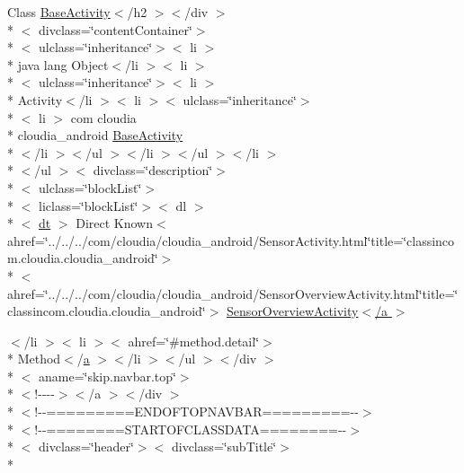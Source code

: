 \begin{DoxyCompactItemize}
 Class \hyperlink{index-2_8html_a61e95a6a9edfa0964ff3438abd1581e4}{Base\-Activity}$<$/h2 $>$$<$/div $>$\\*
$<$ divclass=\char`\"{}content\-Container\char`\"{}$>$\\*
$<$ ulclass=\char`\"{}inheritance\char`\"{}$>$$<$ li $>$\\*
 java lang Object$<$/li $>$$<$ li $>$\\*
$<$ ulclass=\char`\"{}inheritance\char`\"{}$>$$<$ li $>$\\*
 Activity$<$/li $>$$<$ li $>$$<$ ulclass=\char`\"{}inheritance\char`\"{}$>$\\*
$<$ li $>$ com cloudia \\*
cloudia\-\_\-android \hyperlink{index-2_8html_a61e95a6a9edfa0964ff3438abd1581e4}{Base\-Activity}\\*
$<$/li $>$$<$/ul $>$$<$/li $>$$<$/ul $>$$<$/li $>$\\*
$<$/ul $>$$<$ divclass=\char`\"{}description\char`\"{}$>$\\*
$<$ ulclass=\char`\"{}block\-List\char`\"{}$>$\\*
$<$ liclass=\char`\"{}block\-List\char`\"{}$>$$<$ dl $>$\\*
$<$ \hyperlink{stylesheet_8css_a107565fb4039d33b041380d6e0ea1d80}{dt} $>$ Direct Known$<$ ahref=\char`\"{}../../../com/cloudia/cloudia\-\_\-android/Sensor\-Activity.\-html\char`\"{}title=\char`\"{}classincom.\-cloudia.\-cloudia\-\_\-android\char`\"{}$>$\\*
$<$ ahref=\char`\"{}../../../com/cloudia/cloudia\-\_\-android/Sensor\-Overview\-Activity.\-html\char`\"{}title=\char`\"{}classincom.\-cloudia.\-cloudia\-\_\-android\char`\"{}$>$ \hyperlink{_base_activity_8html_aec8cf4843945e2d6c46ba25ac6a5a815}{Sensor\-Overview\-Activity$<$/a $>$}
\item 
$<$/li $>$$<$ li $>$$<$ ahref=\char`\"{}\#method.\-detail\char`\"{}$>$\\*
 Method$<$/\hyperlink{style_8css_a5e8981582017bb8b84c21f148345d1f7}{a} $>$$<$/li $>$$<$/ul $>$$<$/div $>$\\*
$<$ aname=\char`\"{}skip.\-navbar.\-top\char`\"{}$>$\\*
$<$!-\/-\/-\/-\/$>$$<$/a $>$$<$/div $>$\\*
$<$!-\/-\/=========E\-N\-D\-O\-F\-T\-O\-P\-N\-A\-V\-B\-A\-R=========-\/-\/$>$\\*
$<$!-\/-\/========S\-T\-A\-R\-T\-O\-F\-C\-L\-A\-S\-S\-D\-A\-T\-A========-\/-\/$>$\\*
$<$ divclass=\char`\"{}header\char`\"{}$>$$<$ divclass=\char`\"{}sub\-Title\char`\"{}$>$\\*

\end{DoxyCompactItemize}
